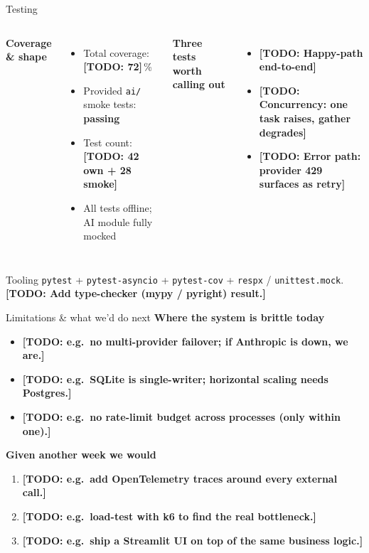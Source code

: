 \documentclass[aspectratio=169,11pt]{beamer}
\newcommand{\TODO}[1]{\textcolor{accent2}{\textbf{[TODO: #1]}}}
\begin{document}
\begin{frame}{Testing}
  \begin{columns}[T,onlytextwidth]
  \textbf{Coverage \& shape}
  \begin{itemize}\setlength\itemsep{0.3em}
    \item Total coverage: \TODO{72}\,\%
    \item Provided \texttt{ai/} smoke tests: \textcolor{ok}{\textbf{passing}}
    \item Test count: \TODO{42 own + 28 smoke}
    \item All tests offline; AI module fully mocked
  \end{itemize}

  \textbf{Three tests worth calling out}
  \begin{itemize}\setlength\itemsep{0.3em}
    \item \TODO{Happy-path end-to-end}
    \item \TODO{Concurrency: one task raises, gather degrades}
    \item \TODO{Error path: provider 429 surfaces as retry}
  \end{itemize}
  \end{columns}

  \vspace{0.6em}
  \begin{block}{Tooling}
    \texttt{pytest} + \texttt{pytest-asyncio} + \texttt{pytest-cov} + \texttt{respx} / \texttt{unittest.mock}. \TODO{Add type-checker (mypy / pyright) result.}
  \end{block}
\end{frame}

\begin{frame}{Limitations \& what we'd do next}
  \textbf{Where the system is brittle today}
  \begin{itemize}\setlength\itemsep{0.3em}
    \item \TODO{e.g.\ no multi-provider failover; if Anthropic is down, we are.}
    \item \TODO{e.g.\ SQLite is single-writer; horizontal scaling needs Postgres.}
    \item \TODO{e.g.\ no rate-limit budget across processes (only within one).}
  \end{itemize}

  \vspace{0.4em}
  \textbf{Given another week we would}
  \begin{enumerate}\setlength\itemsep{0.3em}
    \item \TODO{e.g.\ add OpenTelemetry traces around every external call.}
    \item \TODO{e.g.\ load-test with k6 to find the real bottleneck.}
    \item \TODO{e.g.\ ship a Streamlit UI on top of the same business logic.}
  \end{enumerate}
\end{frame}
\end{document}
